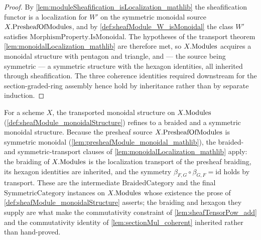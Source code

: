 \begin{proof}
  \leanok
  By \cref{lem:moduleSheafification_isLocalization_mathlib} the sheafification
  functor is a localization for \(W'\) on the symmetric monoidal source
  \(X.\mathrm{PresheafOfModules}\), and by \cref{def:sheafModule_W_isMonoidal} the class \(W'\)
  satisfies \(\mathrm{MorphismProperty.IsMonoidal}\). The hypotheses of the
  transport theorem \cref{lem:monoidalLocalization_mathlib} are therefore met, so
  \(X.\mathrm{Modules}\) acquires a monoidal structure with pentagon and triangle, and ---
  the source being symmetric --- a symmetric structure with the hexagon
  identities, all inherited through sheafification. The three coherence
  identities required downstream for the section-graded-ring assembly hence hold by
  inheritance rather than by separate induction.
\end{proof}

\begin{corollary}
  \label{cor:sheafModule_braided_symmetric}
  For a scheme \(X\), the transported monoidal structure on \(X.\mathrm{Modules}\)
  (\cref{def:sheafModule_monoidalStructure}) refines to a braided and a symmetric
  monoidal structure. Because the presheaf source \(X.\mathrm{PresheafOfModules}\) is symmetric
  monoidal (\cref{lem:presheafModule_monoidal_mathlib}), the braided- and
  symmetric-transport clauses of \cref{lem:monoidalLocalization_mathlib} apply:
  the braiding of \(X.\mathrm{Modules}\) is the localization transport of the presheaf
  braiding, its hexagon identities are inherited, and the symmetry
  \(\beta_{F,G} \circ \beta_{G,F} = \mathrm{id}\) holds by transport. These are
  the intermediate \(\mathrm{BraidedCategory}\) and the final
  \(\mathrm{SymmetricCategory}\) instances on \(X.\mathrm{Modules}\) whose existence the
  prose of \cref{def:sheafModule_monoidalStructure} asserts; the braiding and
  hexagon they supply are what make the commutativity constraint of
  \cref{lem:sheafTensorPow_add} and the commutativity identity of
  \cref{lem:sectionMul_coherent} inherited rather than hand-proved.
\end{corollary}

